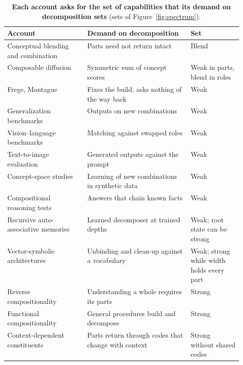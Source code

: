 \begin{table}[tp]
  \caption{\textbf{Each account asks for the set of capabilities that its demand on decomposition sets} (sets of Figure~\ref{fig:spectrum}).}
  \label{tab:spectrum}
  \centering\footnotesize
  \begin{tabularx}{\linewidth}{@{}P{0.34\linewidth}YP{0.22\linewidth}@{}}
    \toprule
    Account & Demand on decomposition & Set \\
    \midrule
    Conceptual blending and combination \citep{fauconnier2002,osherson1981,kamp1995} & Parts need not return intact & Blend \\
    Composable diffusion \citep{liu2022composable} & Symmetric sum of concept scores & Weak in parts, blend in roles \\
    \addlinespace
    Frege, Montague \citep{frege1923,montague1970} & Fixes the build, asks nothing of the way back & Weak \\
    Generalization benchmarks \citep{lake2018,kim2020cogs,keysers2020,hupkes2020,lake2023} & Outputs on new combinations & Weak \\
    Vision--language benchmarks \citep{thrush2022winoground,yuksekgonul2023} & Matching against swapped roles & Weak \\
    Text-to-image evaluation \citep{ramesh2021,huang2023t2i,ghosh2023geneval} & Generated outputs against the prompt & Weak \\
    Concept-space studies \citep{okawa2023,park2024hidden,favero2025diffusion} & Learning of new combinations in synthetic data & Weak \\
    Compositional reasoning tests \citep{dziri2023,press2023} & Answers that chain known facts & Weak \\
    Recursive auto-associative memories \citep{pollack1990} & Learned decomposer at trained depths & Weak; root state can be strong \\
    Vector-symbolic architectures \citep{plate1995,gayler2006,kanerva2009} & Unbinding and clean-up against a vocabulary & Weak; strong while width holds every part \\
    \addlinespace
    Reverse compositionality \citep{fodor2002} & Understanding a whole requires its parts & Strong \\
    Functional compositionality \citep{vangelder1990} & General procedures build and decompose & Strong \\
    Context-dependent constituents \citep{smolensky1988} & Parts return through codes that change with context & Strong without shared codes \\

\end{tabularx}
\end{table}
